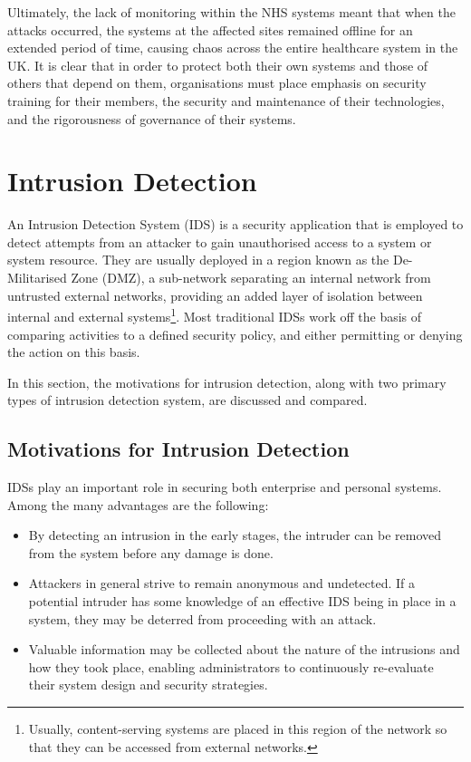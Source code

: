     Ultimately, the lack of monitoring within the NHS systems meant that when the attacks occurred, the systems at the affected sites remained offline for an extended period of time, causing chaos across the entire healthcare system in the UK.  It is clear that in order to protect both their own systems and those of others that depend on them, organisations must place emphasis on security training for their members, the security and maintenance of their technologies, and the rigorousness of governance of their systems. 






\section{Intrusion Detection} \label{IntrusionDetectionSection}

An Intrusion Detection System (IDS) is a security application that is employed to detect attempts from an attacker to gain unauthorised access to a system or system resource. They are usually deployed in a region known as the De-Militarised Zone (DMZ), a sub-network separating an internal network from untrusted external networks, providing an added layer of isolation between internal and external systems\footnote{Usually, content-serving systems are placed in this region of the network so that they can be accessed from external networks.}. Most traditional IDSs work off the basis of comparing activities to a defined security policy, and either permitting or denying the action on this basis.

In this section, the motivations for intrusion detection, along with two primary types of intrusion detection system, are discussed and compared.


\subsection{Motivations for Intrusion Detection} \label{MotivationsForIntrusionDetection}
IDSs play an important role in securing both enterprise and personal systems. Among the many advantages are the following:
\begin{itemize}
\item By detecting an intrusion in the early stages, the intruder can be removed from the system before any damage is done.
\item Attackers in general strive to remain anonymous and undetected. If a potential intruder has some knowledge of an effective IDS being in place in a system, they may be deterred from proceeding with an attack.
\item Valuable information may be collected about the nature of the intrusions and how they took place, enabling administrators to continuously re-evaluate their system design and security strategies. 
\end{itemize}

